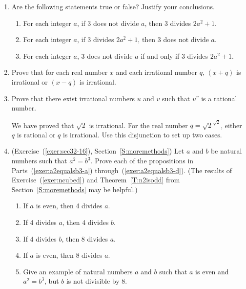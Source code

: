 \begin{enumerate}
\item Are the following statements true or false?  Justify your conclusions.
\begin{enumerate}
  \item For each integer $a$, if 3 does not divide $a$, then 3 divides $2a^2 + 1$.
  \item For each integer $a$, if 3 divides $2a^2 + 1$, then 3 does not divide $a$.
  \item For each integer $a$, 3 does not divide $a$ if and only if 3 divides $2a^2 + 1$.
\end{enumerate}



\item Prove that for each real number $x$ and each irrational number $q$, $(x + q)$ is irrational or 
$(x - q)$ is irrational.


\item Prove that there exist irrational numbers $u$ and $v$ such that $u^v$ is a rational number.

\hint We have proved that $\sqrt{2}$ is irrational.  For the real number $q = \sqrt{2}^{\sqrt{2}}$, either $q$ is rational or $q$ is irrational.  Use this disjunction to set up two cases.   



\item (Exercise~(\ref{exer:sec32-16}), Section~\ref{S:moremethods}) Let  $a$  and  $b$  be natural numbers such that  $a^2  = b^3 $.  Prove each of the propositions in Parts~(\ref{exer:a2equalsb3-a}) through~(\ref{exer:a2equalsb3-d}).  (The results of Exercise~(\ref{exer:ncubed}) and Theorem~\ref{T:n2isodd} from Section~\ref{S:moremethods} may be helpful.)
\label{exer:sec32-9}%

\begin{enumerate}
  \item If  $a$  is even, then  4  divides  $a$. 
\label{exer:a2equalsb3-a}%
  \item If  4  divides  $a$, then  4  divides  $b$.
  \item If  4  divides  $b$, then  8  divides  $a$.
  \item If  $a$  is even, then  8 divides  $a$.  
\label{exer:a2equalsb3-d}%
  \item Give an example of natural numbers  $a$  and  $b$  such that  $a$  is even and  $a^2  = b^3 $, but  $b$  is not divisible by  8.
\end{enumerate}




\end{enumerate}
